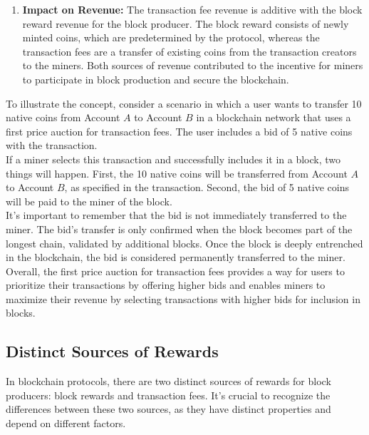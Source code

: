 \begin{enumerate}
  \item \textbf{Impact on Revenue:} The transaction fee revenue is additive with the block reward revenue for the block producer. The block reward consists of newly minted coins, which are predetermined by the protocol, whereas the transaction fees are a transfer of existing coins from the transaction creators to the miners. Both sources of revenue contributed to the incentive for miners to participate in block production and secure the blockchain.

\end{enumerate}

To illustrate the concept, consider a scenario in which a user wants to transfer 10 native coins from Account $A$ to Account $B$ in a blockchain network that uses a first price auction for transaction fees. The user includes a bid of 5 native coins with the transaction.\\
If a miner selects this transaction and successfully includes it in a block, two things will happen. First, the 10 native coins will be transferred from Account $A$ to Account $B$, as specified in the transaction. Second, the bid of 5 native coins will be paid to the miner of the block.\\
It's important to remember that the bid is not immediately transferred to the miner. The bid's transfer is only confirmed when the block becomes part of the longest chain, validated by additional blocks. Once the block is deeply entrenched in the blockchain, the bid is considered permanently transferred to the miner.\\
Overall, the first price auction for transaction fees provides a way for users to prioritize their transactions by offering higher bids and enables miners to maximize their revenue by selecting transactions with higher bids for inclusion in blocks.

\subsection{Distinct Sources of Rewards}
In blockchain protocols, there are two distinct sources of rewards for block producers: block rewards and transaction fees. It's crucial to recognize the differences between these two sources, as they have distinct properties and depend on different factors.

